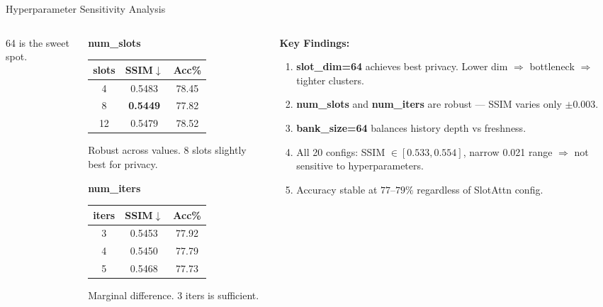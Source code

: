 \documentclass[aspectratio=169, 10pt]{beamer}
\newcommand{\good}[1]{\textcolor{goodgreen}{#1}}
\begin{document}
\begin{frame}{Hyperparameter Sensitivity Analysis}
\begin{columns}[T]
\begin{column}{0.32\textwidth}
\small
\vspace{0.1cm}
64 is the sweet spot.
\end{column}
\begin{column}{0.32\textwidth}
\textbf{num\_slots}

\vspace{0.1cm}
\scriptsize
\begin{tabular}{ccc}
\toprule
\textbf{slots} & \textbf{SSIM}$\downarrow$ & \textbf{Acc\%} \\
\midrule
4 & 0.5483 & 78.45 \\
\rowcolor{green!8}
8 & \textbf{0.5449} & 77.82 \\
12 & 0.5479 & 78.52 \\
\bottomrule
\end{tabular}

\small
\vspace{0.1cm}
Robust across values. 8 slots slightly best for privacy.

\vspace{0.2cm}
\textbf{num\_iters}

\vspace{0.1cm}
\scriptsize
\begin{tabular}{ccc}
\toprule
\textbf{iters} & \textbf{SSIM}$\downarrow$ & \textbf{Acc\%} \\
\midrule
3 & 0.5453 & 77.92 \\
4 & 0.5450 & 77.79 \\
5 & 0.5468 & 77.73 \\
\bottomrule
\end{tabular}

\small
\vspace{0.1cm}
Marginal difference. 3 iters is sufficient.
\end{column}
\begin{column}{0.32\textwidth}
\textbf{Key Findings:}

\vspace{0.05cm}
\small
\begin{enumerate}\setlength{\itemsep}{1pt}
    \item \textbf{slot\_dim=64} achieves best privacy. Lower dim $\Rightarrow$ bottleneck $\Rightarrow$ tighter clusters.

    \item \textbf{num\_slots} and \textbf{num\_iters} are \good{robust} --- SSIM varies only $\pm$0.003.

    \item \textbf{bank\_size=64} balances history depth vs freshness.

    \item All 20 configs: SSIM $\in [0.533, 0.554]$, narrow 0.021 range $\Rightarrow$ \good{not sensitive} to hyperparameters.

    \item Accuracy stable at $77$--$79\%$ regardless of SlotAttn config.
\end{enumerate}
\end{column}
\end{columns}

\end{frame}
\end{document}
